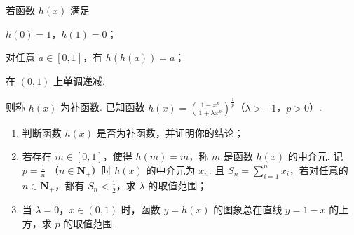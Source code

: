 \begin{problem}
若函数 \(h(x)\) 满足
\begin{circlelist}
\item \(h(0)=1\)，\(h(1)=0\)；
\item 对任意 \(a \in [0,1]\)，有 \(h(h(a)) = a\)；
\item 在 \((0,1)\) 上单调递减.
\end{circlelist}
则称 \(h(x)\) 为补函数. 已知函数 \(h(x) = \left(\frac{1 - x^{p}}{1 + \lambda x^{p}}\right)^{\frac{1}{p}}\)（\(\lambda > -1\)，\(p > 0\)）.
\begin{enumerate}
\item 判断函数 \(h(x)\) 是否为补函数，并证明你的结论；
\item 若存在 \(m \in [0,1]\)，使得 \(h(m) = m\)，称 \(m\) 是函数 \(h(x)\) 的中介元. 记 \(p = \frac{1}{n} \) （\(n \in \mathbf{N}_+\)）时 \(h(x)\) 的中介元为 \(x_n\). 且 \(S_n = \sum_{i=1}^{n} x_i\)，若对任意的 \(n \in \mathbf{N}_+\)，都有 \(S_n < \frac{1}{2}\)，求 \(\lambda\) 的取值范围；
\item 当 \(\lambda = 0\)，\(x \in (0,1)\) 时，函数 \(y = h(x)\) 的图象总在直线 \(y = 1 - x\) 的上方，求 \(p\) 的取值范围.
\end{enumerate}
\end{problem}

